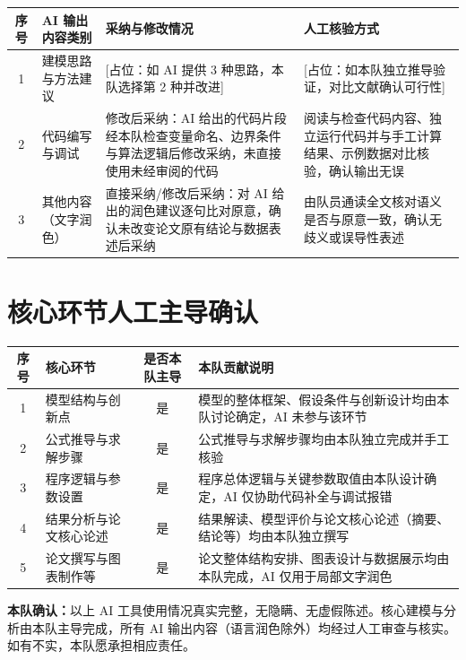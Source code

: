 \documentclass[12pt, a4paper, scheme=chinese, fontset=windows]{ctexart}
\begin{document}
\begin{longtable}{cp{3.4cm}p{4.6cm}p{4.6cm}}
\toprule
序号 & AI 输出内容类别 & 采纳与修改情况 & 人工核验方式 \\
\midrule
\endhead
1 & 建模思路与方法建议 & [占位：如 AI 提供 3 种思路，本队选择第 2 种并改进] & [占位：如本队独立推导验证，对比文献确认可行性] \\
2 & 代码编写与调试 & 修改后采纳：AI 给出的代码片段经本队检查变量命名、边界条件与算法逻辑后修改采纳，未直接使用未经审阅的代码 & 阅读与检查代码内容、独立运行代码并与手工计算结果、示例数据对比核验，确认输出无误 \\
3 & 其他内容（文字润色） & 直接采纳/修改后采纳：对 AI 给出的润色建议逐句比对原意，确认未改变论文原有结论与数据表述后采纳 & 由队员通读全文核对语义是否与原意一致，确认无歧义或误导性表述 \\
\bottomrule
\end{longtable}

\section*{核心环节人工主导确认}

\begin{longtable}{cp{3.6cm}cp{5cm}}
\toprule
序号 & 核心环节 & 是否本队主导 & 本队贡献说明 \\
\midrule
\endhead
1 & 模型结构与创新点 & 是 & 模型的整体框架、假设条件与创新设计均由本队讨论确定，AI 未参与该环节 \\
2 & 公式推导与求解步骤 & 是 & 公式推导与求解步骤均由本队独立完成并手工核验 \\
3 & 程序逻辑与参数设置 & 是 & 程序总体逻辑与关键参数取值由本队设计确定，AI 仅协助代码补全与调试报错 \\
4 & 结果分析与论文核心论述 & 是 & 结果解读、模型评价与论文核心论述（摘要、结论等）均由本队独立撰写 \\
5 & 论文撰写与图表制作等 & 是 & 论文整体结构安排、图表设计与数据展示均由本队完成，AI 仅用于局部文字润色 \\
\bottomrule
\end{longtable}

\bigskip
\noindent\textbf{本队确认：}以上 AI 工具使用情况真实完整，无隐瞒、无虚假陈述。核心建模与分析由本队主导完成，所有 AI 输出内容（语言润色除外）均经过人工审查与核实。如有不实，本队愿承担相应责任。
\end{document}
